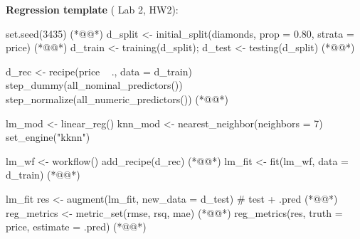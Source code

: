 \textbf{Regression template} ( Lab 2,  HW2):
\begin{rcode}
set.seed(3435)                                     (*@@*)
d_split <- initial_split(diamonds, prop = 0.80, strata = price) (*@@*)
d_train <- training(d_split); d_test <- testing(d_split) (*@@*)

d_rec <- recipe(price ~ ., data = d_train) %
  step_dummy(all_nominal_predictors()) %
  step_normalize(all_numeric_predictors())         (*@@*)

lm_mod <- linear_reg() %
knn_mod <- nearest_neighbor(neighbors = 7) %
  set_engine("kknn") %

lm_wf <- workflow() %
  add_recipe(d_rec)                                (*@@*)
lm_fit <- fit(lm_wf, data = d_train)               (*@@*)

lm_fit %
res <- augment(lm_fit, new_data = d_test)  # test + .pred (*@@*)
reg_metrics <- metric_set(rmse, rsq, mae)          (*@@*)
reg_metrics(res, truth = price, estimate = .pred)  (*@@*)
\end{rcode}

